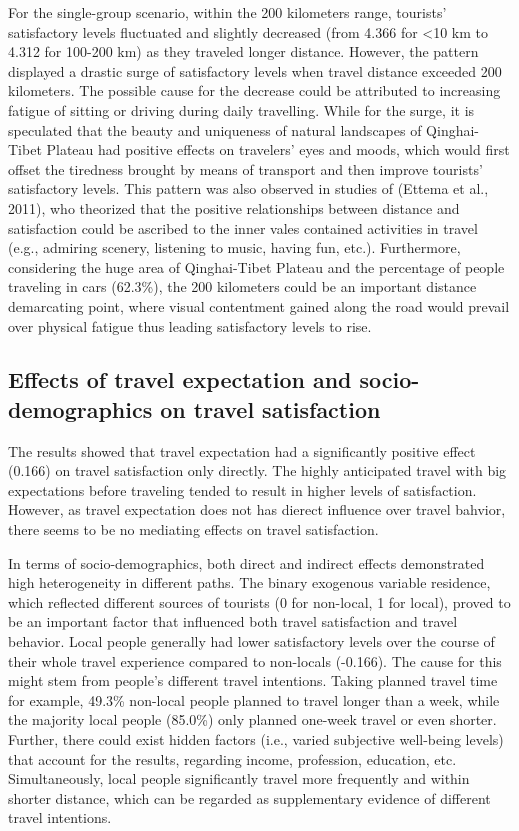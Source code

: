 \documentclass[
11pt, %
oneside, %
english, %
singlespacing, %
]{macthesis} %
\begin{document}
For the single-group scenario, within the 200 kilometers range, tourists' satisfactory levels fluctuated and slightly decreased (from 4.366 for \textless10 km to 4.312 for 100-200 km) as they traveled longer distance. However, the pattern displayed a drastic surge of satisfactory levels when travel distance exceeded 200 kilometers. The possible cause for the decrease could be attributed to increasing fatigue of sitting or driving during daily travelling. While for the surge, it is speculated that the beauty and uniqueness of natural landscapes of Qinghai-Tibet Plateau had positive effects on travelers' eyes and moods, which would first offset the tiredness brought by means of transport and then improve tourists' satisfactory levels. This pattern was also observed in studies of (Ettema et al., 2011), who theorized that the positive relationships between distance and satisfaction could be ascribed to the inner vales contained activities in travel (e.g., admiring scenery, listening to music, having fun, etc.). Furthermore, considering the huge area of Qinghai-Tibet Plateau and the percentage of people traveling in cars (62.3\%), the 200 kilometers could be an important distance demarcating point, where visual contentment gained along the road would prevail over physical fatigue thus leading satisfactory levels to rise.

\subsection{Effects of travel expectation and socio-demographics on travel satisfaction}\label{effects-of-travel-expectation-and-socio-demographics-on-travel-satisfaction}

The results showed that travel expectation had a significantly positive effect (0.166) on travel satisfaction only directly. The highly anticipated travel with big expectations before traveling tended to result in higher levels of satisfaction. However, as travel expectation does not has dierect influence over travel bahvior, there seems to be no mediating effects on travel satisfaction.

In terms of socio-demographics, both direct and indirect effects demonstrated high heterogeneity in different paths. The binary exogenous variable residence, which reflected different sources of tourists (0 for non-local, 1 for local), proved to be an important factor that influenced both travel satisfaction and travel behavior. Local people generally had lower satisfactory levels over the course of their whole travel experience compared to non-locals (-0.166). The cause for this might stem from people's different travel intentions. Taking planned travel time for example, 49.3\% non-local people planned to travel longer than a week, while the majority local people (85.0\%) only planned one-week travel or even shorter. Further, there could exist hidden factors (i.e., varied subjective well-being levels) that account for the results, regarding income, profession, education, etc. Simultaneously, local people significantly travel more frequently and within shorter distance, which can be regarded as supplementary evidence of different travel intentions.
\end{document}
